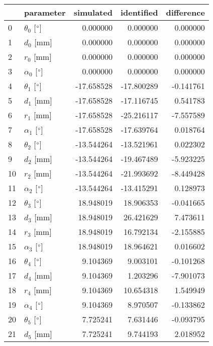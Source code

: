 \documentclass{standalone}%
\begin{document}
%
\normalsize%
\begin{tabular}{llrrr}
\toprule
{} &                 parameter &  simulated & identified & difference \\
\midrule
0  &  $\theta_{0}$ [$\degree$] &   0.000000 &   0.000000 &   0.000000 \\
1  &              $d_{0}$ [mm] &   0.000000 &   0.000000 &   0.000000 \\
2  &              $r_{0}$ [mm] &   0.000000 &   0.000000 &   0.000000 \\
3  &  $\alpha_{0}$ [$\degree$] &   0.000000 &   0.000000 &   0.000000 \\
4  &  $\theta_{1}$ [$\degree$] & -17.658528 & -17.800289 &  -0.141761 \\
5  &              $d_{1}$ [mm] & -17.658528 & -17.116745 &   0.541783 \\
6  &              $r_{1}$ [mm] & -17.658528 & -25.216117 &  -7.557589 \\
7  &  $\alpha_{1}$ [$\degree$] & -17.658528 & -17.639764 &   0.018764 \\
8  &  $\theta_{2}$ [$\degree$] & -13.544264 & -13.521961 &   0.022302 \\
9  &              $d_{2}$ [mm] & -13.544264 & -19.467489 &  -5.923225 \\
10 &              $r_{2}$ [mm] & -13.544264 & -21.993692 &  -8.449428 \\
11 &  $\alpha_{2}$ [$\degree$] & -13.544264 & -13.415291 &   0.128973 \\
12 &  $\theta_{3}$ [$\degree$] &  18.948019 &  18.906353 &  -0.041665 \\
13 &              $d_{3}$ [mm] &  18.948019 &  26.421629 &   7.473611 \\
14 &              $r_{3}$ [mm] &  18.948019 &  16.792134 &  -2.155885 \\
15 &  $\alpha_{3}$ [$\degree$] &  18.948019 &  18.964621 &   0.016602 \\
16 &  $\theta_{4}$ [$\degree$] &   9.104369 &   9.003101 &  -0.101268 \\
17 &              $d_{4}$ [mm] &   9.104369 &   1.203296 &  -7.901073 \\
18 &              $r_{4}$ [mm] &   9.104369 &  10.654318 &   1.549949 \\
19 &  $\alpha_{4}$ [$\degree$] &   9.104369 &   8.970507 &  -0.133862 \\
20 &  $\theta_{5}$ [$\degree$] &   7.725241 &   7.631446 &  -0.093795 \\
21 &              $d_{5}$ [mm] &   7.725241 &   9.744193 &   2.018952 \\

\end{tabular}
\end{document}
